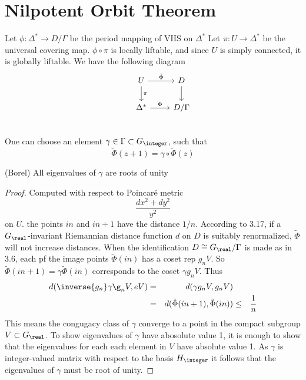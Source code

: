 \documentclass{article}
\begin{document}
\section{Nilpotent Orbit Theorem}
Let $\phi: \Delta^* \rightarrow D/\Gamma$ be the period mapping of VHS on $\Delta^*$
Let $\pi: U \rightarrow \Delta^*$ be the universal covering map. $\phi\circ\pi$ is locally
liftable, and since $U$ is simply connected, it is globally liftable. We have the following diagram
\[
\begin{tikzcd}
    & U \arrow{r}{\tilde{\Phi}}\arrow{d}{\pi} 
        & D \arrow{d} \\
    & \Delta^* \arrow{r}{\Phi} 
        & D/\Gamma \\
\end{tikzcd}
\]
One can choose an element $\gamma \in \Gamma\subset G_{\integer}$, such that
\[
    \tilde{\Phi}(z+1) = \gamma\circ\tilde{\Phi}(z)
\]
\begin{lemma}(Borel)
All eigenvalues of $\gamma$ are roots of unity
\end{lemma}
\begin{proof}
Computed with respect to Poincar\'e metric 
\[
    \frac{dx^2 + dy^2}{y^2}
\]
on $U$. the points $in$ and $in + 1$ have the distance $1/n$.
According to 3.17, if a $G_{\real}$-invariant Riemannian distance function $d$
on $D$ is suitably renormalized, $\tilde{\Phi}$ will not increase distances.
When the identification $D \cong G_{\real}/\Gamma$ is made as in 3.6, each
pf the image points $\tilde{\Phi}(in)$ has a coset rep $g_nV$. So
$\tilde{\Phi}(in + 1) = \gamma\tilde{\Phi}(in)$ corresponds to the coset $\gamma g_nV$.
Thus
\begin{align*}
    d(\inverse{g_n}\gamma\g_n V, eV) & = & d(\gamma g_nV, g_nV) \\
                                     & = & d(\tilde{\Phi}(in+1), \tilde{\Phi}(in))
                                     & \le & \frac{1}{n}
\end{align*}
This means the congugacy class of $\gamma$ converge to a point in the compact subgroup
$V \subset G_{\real}$. To show eigenvalues of $\gamma$ have abosolute value 1, 
it is enough to show that the eigenvalues for each each element in $V$ have absolute 
value 1. As $\gamma$ is integer-valued matrix with respect to the basis $H_{\integer}$
it follows that the eigenvalues of $\gamma$ must be root of unity. 
\end{proof}
\end{document}
